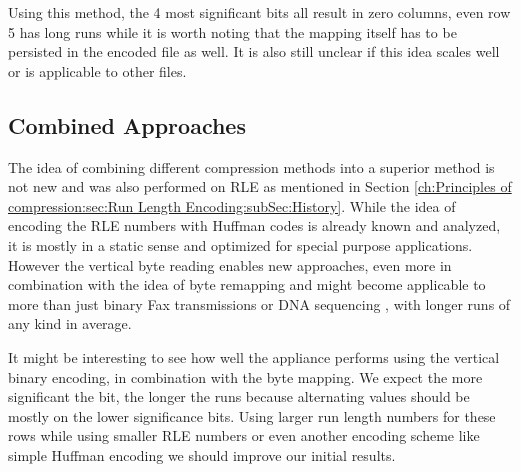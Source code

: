 \par{
\arraydump\dataC

Using this method, the 4 most significant bits all result in zero columns, even row 5 has long runs while it is worth noting that the mapping itself has to be persisted in the encoded file as well. It is also still unclear if this idea scales well or is applicable to other files.
}

\subsection{Combined Approaches}
\par{
The idea of combining different compression methods into a superior method is not new and was also performed on RLE as mentioned in Section \ref{ch:Principles of compression:sec:Run Length Encoding:subSec:History}. While the idea of encoding the RLE numbers with Huffman codes is already known and analyzed, it is mostly in a static sense and optimized for special purpose applications. However the vertical byte reading enables new approaches, even more in combination with the idea of byte remapping and might become applicable to more than just binary Fax transmissions or DNA sequencing \cite{rle-bio},\cite{rle-dna} with longer runs of any kind in average.
}
\par{
It might be interesting to see how well the appliance performs using the vertical binary encoding, in combination with the byte mapping. We expect the more significant the bit, the longer the runs because alternating values should be mostly on the lower significance bits. Using larger run length numbers for these rows while using smaller RLE numbers or even another encoding scheme like simple Huffman encoding we should improve our initial results.
}

